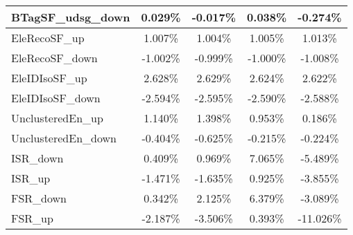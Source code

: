 \begin{table}[]
{\begin{tabular}{|l|c|c|c|c|}
BTagSF\_udsg\_down                          & 0.029\%                           & -0.017\%                           & 0.038\%                          & -0.274\%                           \\ \hline     
EleRecoSF\_up                            & 1.007\%                             & 1.004\%                             & 1.005\%                            & 1.013\%                             \\ \hline    
EleRecoSF\_down                          & -1.002\%                           & -0.999\%                           & -1.000\%                          & -1.008\%                           \\ \hline    
EleIDIsoSF\_up                              & 2.628\%                               & 2.629\%                               & 2.624\%                              & 2.622\%                               \\ \hline    
EleIDIsoSF\_down                            & -2.594\%                             & -2.595\%                             & -2.590\%                            & -2.588\%                             \\ \hline        
UnclusteredEn\_up                         & 1.140\%                          & 1.398\%                          & 0.953\%                         & 0.186\%                          \\ \hline    
UnclusteredEn\_down                      & -0.404\%                         & -0.625\%                        & -0.215\%                       & -0.224\%                        \\ \hline   \hline 
ISR\_down                                & 0.409\%                                   & 0.969\%                                  & 7.065\%                                 & -5.489\%                                  \\ \hline
ISR\_up                                  & -1.471\%                                     & -1.635\%                                    & 0.925\%                                   & -3.855\%                                    \\ \hline
FSR\_down                                & 0.342\%                                   & 2.125\%                                  & 6.379\%                                 & -3.089\%                                  \\ \hline
FSR\_up                                  & -2.187\%                                     & -3.506\%                                    & 0.393\%                                   & -11.026\%                                    \\ \hline 

\end{tabular}}
\end{table}
